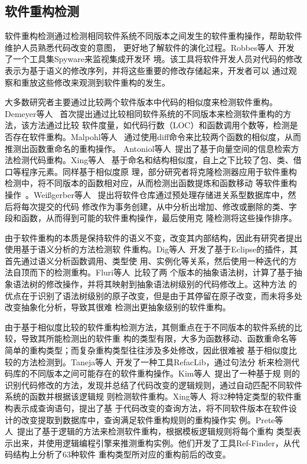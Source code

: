 \subsection{软件重构检测}
软件重构检测通过检测相同软件系统不同版本之间发生的软件重构操作，帮助软件维护人员熟悉代码改变的意图，
更好地了解软件的演化过程。Robbes等人~\cite{robbes2008spyware}开发了一个工具集Spyware来监视集成开发环
境。该工具将软件开发人员对代码的修改表示为基于语义的修改序列，并将这些重要的修改存储起来，开发者可以
通过观察和重放这些修改来观测到软件重构的发生。

大多数研究者主要通过比较两个软件版本中代码的相似度来检测软件重构。Demeyer等人
~\cite{demeyer2000finding}首次提出通过比较相同软件系统的不同版本来检测软件重构的方法，该方法通过比较
软件度量，如代码行数（LOC）和函数调用个数等，检测是否存在软件重构。Malpohl等人
~\cite{malpohl2003renaming}通过使用diff命令来比较两个函数的相似度，从而推测出函数重命名的重构操作。
Antoniol等人~\cite{antoniol2004automatic}提出了基于向量空间的信息检索方法检测代码重构。Xing等人
~\cite{xing2005umldiff}基于命名和结构相似度，自上之下比较了包、类、借口等程序元素。同样基于相似度原
理，部分研究者将克隆检测器应用于软件重构检测中，将不同版本的函数相对应，从而检测出函数提炼和函数移动
等软件重构操作~\cite{van2003reconstruction,kim2005functions}。Weißgerber等人
~\cite{weissgerber2006identifying}提出将软件仓库通过预处理存储进关系型数据库中，然后将每次提交的代码
修改作为事务创建，从中分析出增加、修改或删除的类、字段和函数，从而得到可能的软件重构操作，最后使用克
隆检测将这些操作排序。

由于软件重构的本质是保持软件的语义不变，改变其内部结构，因此有研究者提出使用基于语义分析的方法检测软
件重构。Dig等人~\cite{dig2006automated}开发了基于Eclipse的插件，其首先通过语义分析函数调用、类型使
用、实例化等关系，然后使用一种迭代的方法自顶而下的检测重构。Fluri等人~\cite{fluri2007change}比较了两
个版本的抽象语法树，计算了基于抽象语法树的修改操作，并将其映射到抽象语法树级别的代码修改上。这种方法
的优点在于识别了语法树级别的原子改变，但是由于其停留在原子改变，而未将多处改变抽象化分析，导致其很难
检测出更抽象级别的软件重构。

由于基于相似度比较的软件重构检测方法，其侧重点在于不同版本的软件系统的比较，导致其所能检测出的软件重
构的类型有限，大多为函数移动、函数重命名等简单的重构类型；而复杂重构类型往往涉及多处修改，因此很难被
基于相似度比较的方法检测到。Taneja等人~\cite{taneja2007automated}开发了一种工具RefacLib，通过句法分
析来检测代码库的不同版本之间可能存在的软件重构操作。Kim等人~\cite{kim2007automatic}提出了一种基于规
则的识别代码修改的方法，发现并总结了代码改变的逻辑规则，通过自动匹配不同软件系统的函数并根据该逻辑规
则检测软件重构。Xing等人~\cite{xing2006refactoring}将32种特定类型的软件重构表示成查询语句，提出了基
于代码改变的查询方法，将不同软件版本在软件设计的改变提取到数据库中，查询满足软件重构规则的重构操作实
例。Prete等人~\cite{prete2010template}提出了基于逻辑的方法来检测软件重构，根据模板逻辑规则将每个重构
类型表示出来，并使用逻辑编程引擎来推测重构实例。他们开发了工具Ref-Finder，从代码结构上分析了63种软件
重构类型所对应的重构前后的改变。



